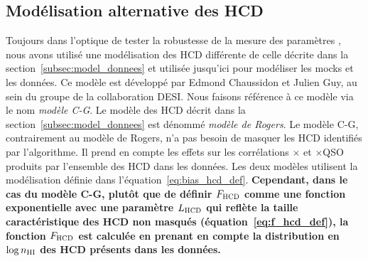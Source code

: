 \documentclass[11pt, twoside, a4paper, openright]{report}
\begin{document}
\subsection{Modélisation alternative des HCD}
\label{subsec:model_alter_hcd}
Toujours dans l'optique de tester la robustesse de la mesure des paramètres \lya{}, nous avons utilisé une modélisation des HCD différente de celle décrite dans la section~\ref{subsec:model_donnees} et utilisée jusqu'ici pour modéliser les mocks et les données.
Ce modèle est développé par Edmond Chaussidon et Julien Guy, au sein du groupe \lya{} de la collaboration DESI.
Nous faisons référence à ce modèle via le nom \emph{modèle C-G}. Le modèle des HCD décrit dans la section~\ref{subsec:model_donnees} est dénommé \emph{modèle de Rogers}.
Le modèle C-G, contrairement au modèle de Rogers, n'a pas besoin de masquer les HCD identifiés par l'algorithme. Il prend en compte les effets sur les corrélations \lya{}$\times$\lya{} et \lya{}$\times$QSO produits par l'ensemble des HCD dans les données.
Les deux modèles utilisent la modélisation définie dans l'équation~\ref{eq:bias_hcd_def}.
\textbf{Cependant, dans le cas du modèle C-G, plutôt que de définir $F_{\textsc{HCD}}$ comme une fonction exponentielle avec une paramètre $L_{\textsc{HCD}}$ qui reflète la taille caractéristique des HCD non masqués (équation~\ref{eq:f_hcd_def}),
la fonction $F_{\textsc{HCD}}$ est calculée en prenant en compte la distribution en $\log n_{\textsc{HI}}$ des HCD présents dans les données.}
\end{document}

